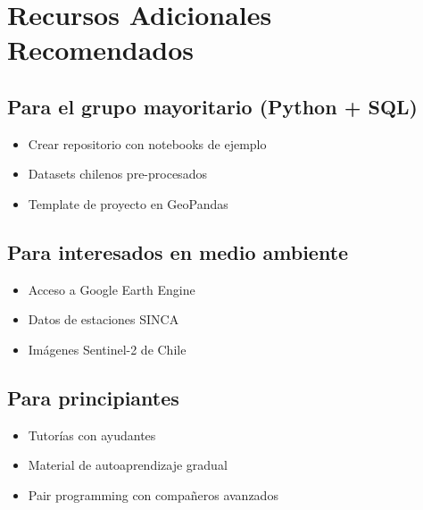 \documentclass[11pt,a4paper]{article}
\begin{document}
\section{Recursos Adicionales Recomendados}

\subsection{Para el grupo mayoritario (Python + SQL)}
\begin{itemize}
    \item Crear repositorio con notebooks de ejemplo
    \item Datasets chilenos pre-procesados
    \item Template de proyecto en GeoPandas
\end{itemize}

\subsection{Para interesados en medio ambiente}
\begin{itemize}
    \item Acceso a Google Earth Engine
    \item Datos de estaciones SINCA
    \item Imágenes Sentinel-2 de Chile
\end{itemize}

\subsection{Para principiantes}
\begin{itemize}
    \item Tutorías con ayudantes
    \item Material de autoaprendizaje gradual
    \item Pair programming con compañeros avanzados
\end{itemize}
\end{document}
